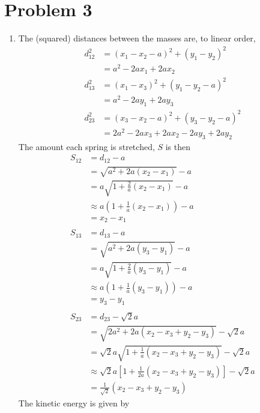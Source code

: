 \documentclass[12pt]{article}
\begin{document}
\section*{Problem 3}
\begin{enumerate}[label=\roman*.]
    \item The (squared) distances between the masses are, to linear order,
    \begin{align*}
        d_{12}^2 &= (x_1 - x_2 - a)^2 + (y_1 - y_2)^2 \\
        &= a^2 - 2ax_1 + 2ax_2 \\
        d_{13}^2 &= (x_1 - x_3)^2 + (y_1 - y_2 - a)^2 \\
        &= a^2 - 2ay_1 + 2ay_3 \\
        d_{23}^2 &= (x_3 - x_2 - a)^2 + (y_3 - y_2 - a)^2 \\
        &= 2a^2 - 2ax_3 + 2ax_2 - 2ay_3 + 2ay_2
    \end{align*}
    The amount each spring is stretched, $S$ is then
    \begin{align*}
        S_{12} &= d_{12} - a \\
        &= \sqrt{a^2 + 2a(x_2 - x_1)} - a \\
        &= a\sqrt{1 + \frac{2}{a}(x_2 - x_1)} - a \\
        &\approx a \left(1 + \frac{1}{a}(x_2 - x_1)\right) - a \\
        &= x_2 - x_1 \\
        \\
        S_{13} &= d_{13} - a \\
        &= \sqrt{a^2 + 2a(y_3 - y_1)} - a \\
        &= a\sqrt{1 + \frac{2}{a}(y_3 - y_1)} - a \\
        &\approx a \left(1 + \frac{1}{a}(y_3 - y_1)\right) - a\\
        &= y_3 - y_1 \\
        \\
        S_{23} &= d_{23} - \sqrt{2}a \\
        &= \sqrt{2a^2 + 2a(x_2 - x_3 + y_2 - y_3)} - \sqrt{2}a\\
        &= \sqrt{2}a \sqrt{1 + \frac{1}{a}(x_2 - x_3 + y_2 - y_3)} - \sqrt{2}a \\
        &\approx \sqrt{2}a\left[1 +  \frac{1}{2a}(x_2 - x_3 + y_2 - y_3)\right] - \sqrt{2}a \\
        &= \frac{1}{\sqrt{2}}(x_2 - x_3 + y_2 - y_3)
    \end{align*}
    The kinetic energy is given by

\end{enumerate}
\end{document}
